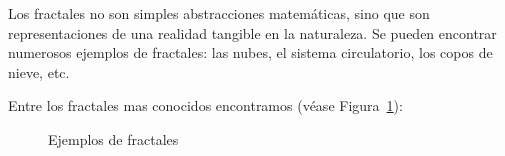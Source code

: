 \documentclass[letterpaper, 11pt, oneside]{article}
\theoremstyle{definition}
\theoremstyle{remark}
\begin{document}
\begin{itemize}
Los fractales no son simples abstracciones matemáticas, sino que son representaciones de una realidad tangible en la naturaleza. Se pueden encontrar numerosos ejemplos de fractales: las nubes, el sistema circulatorio, los copos de nieve, etc.

Entre los fractales mas conocidos encontramos (véase Figura~\ref{ejemp_frac}):

\begin{figure}[h!]
\centering
	\hspace{0cm}
	\hspace{0cm}
\caption{Ejemplos de fractales}
\label{ejemp_frac}
\end{figure}

\end{itemize}
\clearpage
\end{document}

